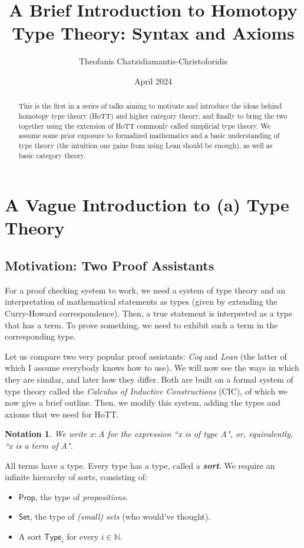 \documentclass{article}
\title{A Brief Introduction to Homotopy Type Theory: Syntax and Axioms}
\author{Theofanis Chatzidiamantis-Christoforidis}
\date{April 2024}
\newcommand{\textbi}[1]{\textbf{\textit{#1}}}
\newcommand{\bN}{\mathbb{N}}
\newcommand{\tProp}{\mathsf{Prop}}
\newcommand{\tSet}{\mathsf{Set}}
\newcommand{\tType}{\mathsf{Type}}
\newtheorem{nota}[subsection]{Notation}
\begin{document}
\maketitle

\tableofcontents

\begin{abstract}
    This is the first in a series of talks aiming to motivate and introduce the ideas behind homotopy type theory (HoTT) and higher category theory, and finally to bring the two together using the extension of HoTT commonly called simplicial type theory. We assume some prior exposure to formalized mathematics and a basic understanding of type theory (the intuition one gains from using Lean should be enough), as well as basic category theory.
\end{abstract}


\section{A Vague Introduction to (a) Type Theory}

\subsection*{Motivation: Two Proof Assistants}

For a proof checking system to work, we need a system of type theory and an interpretation of mathematical statements as types (given by extending the Curry-Howard correspondence). Then, a true statement is interpreted as a type that has a term. To prove something, we need to exhibit such a term in the corresponding type. 
\par Let us compare two very popular proof assistants: \textit{Coq} and \textit{Lean} (the latter of which I assume everybody knows how to use). We will now see the ways in which they are similar, and later how they differ. Both are built on a formal system of type theory called the \textit{Calculus of Inductive Constructions} (CIC), of which we now give a brief outline. Then, we modify this system, adding the types and axioms that we need for HoTT.

\begin{nota}
    We write $x:A$ for the expression ``x is of type A", or, equivalently, ``x is a term of A".
\end{nota}
All terms have a type. Every type has a type, called a \textbi{sort}. We require an infinite hierarchy of sorts, consisting of:
\begin{itemize}
    \item $\tProp$, the type of \textit{propositions}. 
    \item $\tSet$, the type of \textit{(small) sets} (who would've thought).
    \item A sort $\tType_i$ for every $i\in\bN$. 
\end{itemize}
\end{document}
